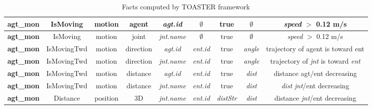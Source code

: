 \documentclass[a4paper]{article}
\begin{document}
\begin{table}
\begin{tabular}{|c|c|c|c|c|c|c|c|c|}
\textbf{agt\_mon} & IsMoving & motion & agent & \textit{agt.id} & $\emptyset$ & true & $\emptyset$ & \textit{speed} $>$ 0.12 m/s  \\
\hline

\textbf{agt\_mon} & IsMoving & motion & joint & \textit{jnt.name} & $\emptyset$ & true & $\emptyset$ & \textit{speed} $>$ 0.12 m/s \\
\hline

\textbf{agt\_mon} & IsMovingTwd & motion & direction & \textit{agt.id} & \textit{ent.id} & true & \textit{angle} & trajectory of agent is toward ent  \\
\hline

\textbf{agt\_mon} & IsMovingTwd & motion & direction & \textit{jnt.name} & \textit{ent.id} & true & \textit{angle} & trajectory of \textit{jnt} is toward \textit{ent}  \\
\hline

\textbf{agt\_mon} & IsMovingTwd & motion & distance & \textit{agt.id} & \textit{ent.id} & true & \textit{dist} & distance agt/ent decreasing  \\
\hline

\textbf{agt\_mon} & IsMovingTwd & motion & distance & \textit{jnt.name} & \textit{ent.id} & true & \textit{dist} & \textit{dist} \textit{jnt}/{ent} decreasing  \\
\hline

\textbf{agt\_mon} & Distance & position & 3D & \textit{jnt.name} & \textit{ent.id} & \textit{distStr} & \textit{dist} & distance \textit{jnt}/ent decreasing  \\
\hline




\end{tabular}
\caption{Facts computed by TOASTER framework}
 \label{table:facts}


\end{table}

\clearpage



\end{document}
